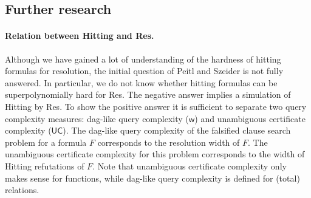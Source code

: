 \documentclass[11pt]{article}
\newcommand{\scterm}[1]{{\textrm{\sc #1}}}
\newcommand{\hit}{\scterm{Hitting}}
\newcommand{\tres}{\scterm{tl-Res}}
\newcommand{\res}{\scterm{Res}}
\newcommand{\extpc}{\scterm{Ext-PC}}
\newcommand{\dagw}{\mathsf{w}}
\newcommand{\ucert}{\mathsf{UC}}
\numberwithin{equation}{section}
\begin{document}
\subsection{Further research}

\paragraph{Relation between {\hit} and {\res}.} 
Although we have gained a lot of understanding of the hardness of hitting formulas for resolution, the initial question of Peitl and Szeider is not fully answered. In particular, we do not know whether hitting formulas can be superpolynomially hard for {\res}. The negative answer implies a simulation of {\hit} by {\res}. 
To show the positive answer it is sufficient to separate two query complexity measures: dag-like query complexity ($\dagw$) and unambiguous certificate complexity ($\ucert$).
The dag-like query complexity of the falsified clause search problem for a formula $F$ corresponds to the resolution width of $F$.
The unambiguous certificate complexity for this problem corresponds to the width of {\hit} refutations of $F$.
Note that unambiguous certificate complexity only makes sense for functions, while dag-like query complexity is defined for (total) relations.
\end{document}
